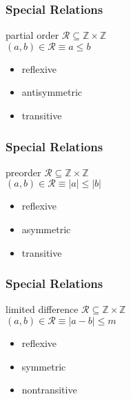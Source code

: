 \documentclass[dvipsnames]{beamer}
\begin{document}
\begin{frame}
  \frametitle{Special Relations}

  \begin{block}{partial order}
    $\mathcal{R} \subseteq \mathbb{Z} \times \mathbb{Z}$\\
    $(a,b) \in \mathcal{R} \equiv a \leq b$

    \medskip
    \begin{itemize}
      \item reflexive
      \item antisymmetric
      \item transitive
    \end{itemize}
  \end{block}
\end{frame}

\begin{frame}
  \frametitle{Special Relations}

  \begin{block}{preorder}
    $\mathcal{R} \subseteq \mathbb{Z} \times \mathbb{Z}$\\
    $(a,b) \in \mathcal{R} \equiv |a| \leq |b|$

    \medskip
    \begin{itemize}
      \item reflexive
      \item asymmetric
      \item transitive
    \end{itemize}
  \end{block}
\end{frame}

\begin{frame}
  \frametitle{Special Relations}

  \begin{block}{limited difference}
    $\mathcal{R} \subseteq \mathbb{Z} \times \mathbb{Z}$\\
    $(a,b) \in \mathcal{R} \equiv |a-b| \leq m$

    \medskip
    \begin{itemize}
      \item reflexive
      \item symmetric
      \item nontransitive
    \end{itemize}
  \end{block}
\end{frame}
\end{document}
